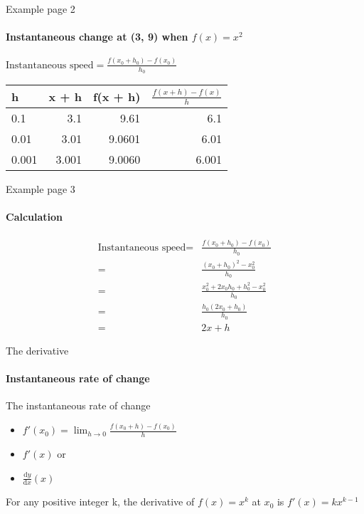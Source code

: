 \documentclass[14pt,xcolor=pdftex,dvipsnames,table]{beamer}
\begin{document}
\begin{frame}{Example page 2}
\framesubtitle{Instantaneous change at (3, 9) when $f(x) = x^2$}
$\text{Instantaneous speed} = \frac{f(x_0 + h_0) - f(x_0)}{h_0}$
\vskip 0.25cm
\begin{center}
\begin{tabular}{l r r r}
h & x + h & f(x + h) & $\frac{f(x +h) - f(x)}{h}$\\
\hline
0.1 & 3.1 & 9.61 & 6.1 \\
0.01 & 3.01 & 9.0601 & 6.01 \\
0.001 & 3.001 & 9.0060 & 6.001\\
\end{tabular}
\end{center}
\end{frame}

\begin{frame}{Example page 3}
\framesubtitle{Calculation}
\begin{align*}
\text{Instantaneous speed} = &\frac{f(x_0 + h_0) - f(x_0)}{h_0}\\
 = & \frac{(x_0 + h_0)^2 - x_0^2}{h_0}\\
 = & \frac{x_0^2 +2x_0h_0 + h_0^2 - x_0^2}{h_0}\\
 = & \frac{h_0(2x_0 + h_0)}{h_0}\\
 = & 2x + h
 \end{align*}
 \end{frame}
 
 \begin{frame}{The derivative}
 \framesubtitle{Instantaneous rate of change}
 The instantaneous rate of change 
 \pause
  \begin{itemize}[<+-| alert@+>]
 \item $f'(x_0) = \lim_{h \to 0} \frac{f(x_0 +h) - f(x_0)}{h}$
 \item $f'(x)$
 or
 \item $\frac{\mathrm d y}{\mathrm d x}(x)$
 \end{itemize}
 \pause
 \begin{block}{}
For any positive integer k, the derivative of $f(x) = x^k$ at $x_0$ is $f'(x) = kx^{k-1}$
\end{block}
\end{frame}


\end{document}

